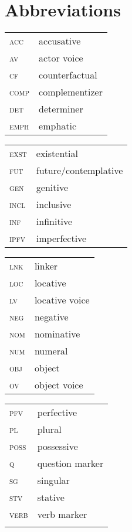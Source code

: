 \documentclass[output=paper,colorlinks,citecolor=brown]{langscibook}
\begin{document}
\section*{Abbreviations}

\begin{tabularx}{.45\textwidth}{@{}lQ}
\textsc{acc} & accusative               \\
\textsc{av}  & actor voice               \\
\textsc{cf}  & counterfactual            \\
\textsc{comp}&  complementizer          \\
\textsc{det} & determiner               \\
\textsc{emph}&  emphatic                \\
\end{tabularx}
\begin{tabularx}{.45\textwidth}{lQ@{}}
\textsc{exst}&  existential             \\
\textsc{fut} & future/contemplative     \\
\textsc{gen} & genitive                 \\
\textsc{incl}&  inclusive               \\
\textsc{inf} & infinitive               \\
\textsc{ipfv}&  imperfective            \\
\end{tabularx}

\noindent
\begin{tabularx}{.5\textwidth}{lQ@{}}
\textsc{lnk} & linker                   \\
\textsc{loc} & locative                 \\
\textsc{lv}  & locative voice            \\
\textsc{neg} & negative                 \\
\textsc{nom} & nominative               \\
\textsc{num} & numeral                  \\
\textsc{obj} & object                   \\
\textsc{ov}  & object voice              \\
\end{tabularx}
\begin{tabularx}{.5\textwidth}{lQ@{}}
\textsc{pfv} & perfective               \\
\textsc{pl}  & plural                    \\
\textsc{poss}&  possessive              \\
\textsc{q}   & question marker           \\
\textsc{sg}  & singular                  \\
\textsc{stv} & stative                  \\
\textsc{verb}&  verb marker             \\
\\
\end{tabularx}

\printbibliography[heading=subbibliography,notkeyword=this]
\end{document}
